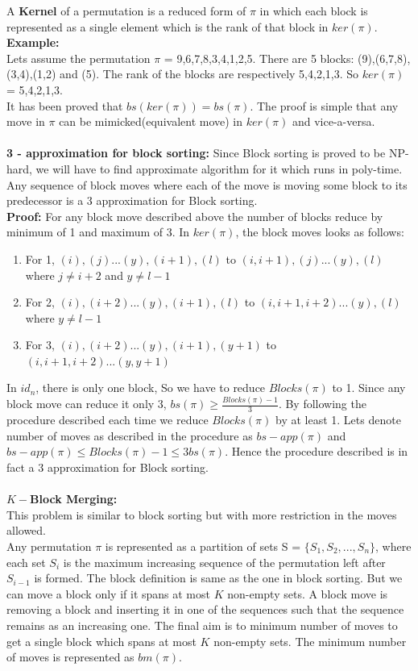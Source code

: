 \documentclass[BTech]{iitmdiss}
\begin{document}
A \textbf{Kernel} of a permutation is a reduced form of $\pi$ in which each block is represented as a single element which is the rank of that block in $ker(\pi)$.\\
\textbf{Example:}\\
Lets assume the permutation $\pi$ = 9,6,7,8,3,4,1,2,5. There are 5 blocks: (9),(6,7,8),(3,4),(1,2) and (5). The rank of the blocks are respectively 5,4,2,1,3. So $ker(\pi)$ = 5,4,2,1,3.\\
It has been proved that $bs(ker(\pi)) = bs(\pi)$. The proof is simple that any move in $\pi$ can be mimicked(equivalent move) in $ker(\pi)$ and vice-a-versa.\\~\\
\noindent
\textbf{3 - approximation for block sorting:} 
Since Block sorting is proved to be NP-hard, we will have to find approximate algorithm for it which runs in poly-time. Any sequence of block moves where each of the move is moving some block to its predecessor is a 3 approximation for Block sorting.\\
\textbf{Proof:}
For any block move described above the number of blocks reduce by minimum of 1 and maximum of 3. In $ker(\pi)$, the block moves looks as follows:
\begin{enumerate}
    \item For 1, $(i),(j)...(y),(i+1),(l)$ to $(i,i+1),(j)...(y),(l)$ where $j \neq i+2$ and $y \neq l-1$
    \item For 2, $(i),(i+2)...(y),(i+1),(l)$ to $(i,i+1,i+2)...(y),(l)$ where $y \neq l-1$
    \item For 3, $(i),(i+2)...(y),(i+1),(y+1)$ to $(i,i+1,i+2)...(y,y+1)$
\end{enumerate}
In $id_n$, there is only one block, So we have to reduce $Blocks(\pi)$ to 1. Since any block move can reduce it only 3, $bs(\pi) \geq \frac{Blocks(\pi) - 1}{3}$. By following the procedure described each time we reduce $Blocks(\pi)$ by at least 1. Lets denote number of moves as described in the procedure as $bs-app(\pi)$ and $bs-app(\pi) \leq Blocks(\pi)-1 \leq 3bs(\pi)$. Hence the procedure described is in fact a 3 approximation for Block sorting.\\~\\
\noindent
\textbf{$K-$Block Merging:}\\
This problem is similar to block sorting but with more restriction in the moves allowed.\\
Any permutation $\pi$ is represented as a partition of sets S = $\{S_1,S_2,...,S_n\}$, where each set $S_i$ is the maximum increasing sequence of the permutation left after $S_{i-1}$ is formed. The block definition is same as the one in block sorting. But we can move a block only if it spans at most $K$ non-empty sets. A block move is removing a block and inserting it in one of the sequences such that the sequence remains as an increasing one.  The final aim is to minimum number of moves to get a single block which spans at most $K$ non-empty sets. The minimum number of moves is represented as $bm(\pi)$.\\
\end{document}
